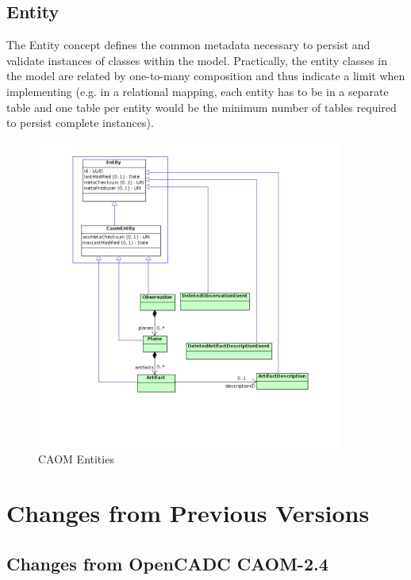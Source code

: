\documentclass[11pt,a4paper]{ivoa}
\begin{document}
\subsection{Entity}

The Entity concept defines the common metadata necessary to persist and validate 
instances of classes within the model. Practically, the entity classes in the 
model are related by one-to-many composition and thus indicate a limit when
implementing (e.g. in a relational mapping, each entity has to be in a separate
table and one table per entity would be the minimum number of tables required 
to persist complete instances).

\begin{figure}
\centering
\includegraphics[width=0.9\textwidth]{src/uml/CAOM4entities.png}
\caption{CAOM Entities}
\label{fig:entity}
\end{figure}




\appendix
\section{Changes from Previous Versions}

\subsection{Changes from OpenCADC CAOM-2.4}
\end{document}
